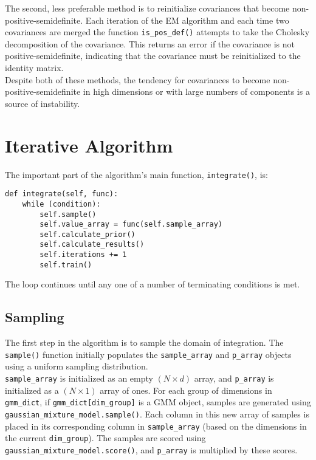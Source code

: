 \documentclass{article}
\begin{document}
The second, less preferable method is to reinitialize covariances that become
non-positive-semidefinite. Each iteration of the EM algorithm and each time two
covariances are merged the function \texttt{is\_pos\_def()} attempts to take the
Cholesky decomposition of the covariance. This returns an error if the covariance
is not positive-semidefinite, indicating that the covariance must be
reinitialized to the identity matrix. \\

Despite both of these methods, the tendency for covariances to become
non-positive-semidefinite in high dimensions or with large numbers of components
is a source of instability.

\section{Iterative Algorithm}

The important part of the algorithm's main function, \texttt{integrate()}, is:
\begin{verbatim}
def integrate(self, func):
    while (condition):
        self.sample()
        self.value_array = func(self.sample_array)
        self.calculate_prior()
        self.calculate_results()
        self.iterations += 1
        self.train()
\end{verbatim}

The loop continues until any one of a number of terminating conditions is met.

\subsection{Sampling}

The first step in the algorithm is to sample the domain of integration. The \texttt{sample()} function initially populates the \texttt{sample\_array} and
\texttt{p\_array} objects using a uniform sampling distribution. \\

\texttt{sample\_array} is initialized as an empty $(N \times d)$ array, and
\texttt{p\_array} is initialized as a $(N \times 1)$ array of ones. For each
group of dimensions in \texttt{gmm\_dict}, if \texttt{gmm\_dict[dim\_group]} is
a GMM object, samples are generated using
\\ \texttt{gaussian\_mixture\_model.sample()}.
Each column in this new array of samples is placed in its corresponding column in
\texttt{sample\_array} (based on the dimensions in the current \texttt{dim\_group}).
The samples are scored using
\\ \texttt{gaussian\_mixture\_model.score()}, and
\texttt{p\_array} is multiplied by these scores. \\
\end{document}
